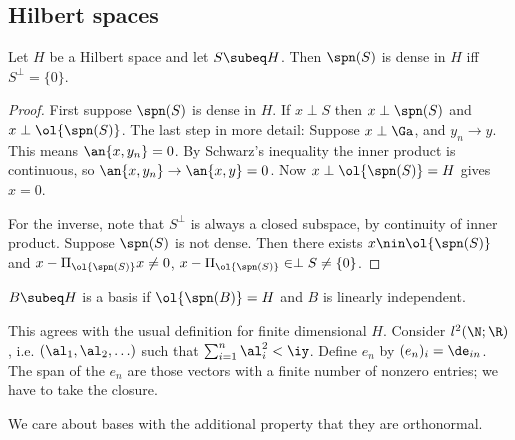 

\subsection{Hilbert spaces}
\begin{thm}\label{densperp}
Let $H$ be a Hilbert space and let $S\subeq H$. Then $\spn(S)$ is dense in $H$ iff $S^{\perp}=\{0\}$.
\end{thm}
\begin{proof}
First suppose $\spn(S)$ is dense in $H$. 
If $x\perp S$ then $x\perp \spn(S)$ and $x\perp\ol{\spn(S)}$. The last step in more detail: Suppose $x\perp \Ga$, and $y_n\to y$. This means $\an{x,y_n}=0$. By Schwarz's inequality the inner product is continuous, so $\an{x,y_n}\to \an{x,y}=0$. Now $x\perp\ol{\spn(S)}=H$ gives $x=0$.

For the inverse, note that $S^{\perp}$ is always a closed subspace, by continuity of inner product. Suppose $\spn(S)$ is not dense. Then there exists $x\nin \ol{\spn(S)}$ and $x-\Pi_{\ol{\spn(S)}}x\ne 0$, $x-\Pi_{\ol{\spn(S)}}\in \perp{S}\neq \{0\}$.
\end{proof}

\begin{df}
$B\subeq H$ is a basis if $\ol{\spn(B)}=H$ and $B$ is linearly independent.
\end{df}
This agrees with the usual definition for finite dimensional $H$. 
Consider $l^2(\N;\R)$, i.e. $(\al_1,\al_2,\ldots)$ such that $\sum_{i=1}^n\al_i^2<\iy$. 
Define $e_n$ by $(e_n)_i=\de_{in}$. The span of the $e_n$ are those vectors with a finite number of nonzero entries; we have to take the closure.

We care about bases with the additional property that they are orthonormal.

